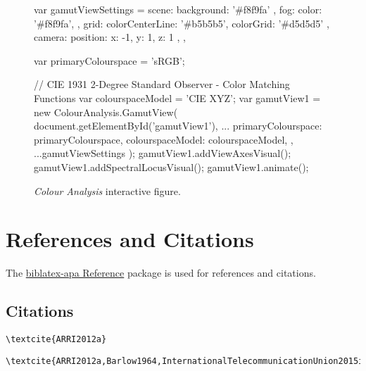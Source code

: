\begin{figure}[H]
    \ifdefined\HCode
        \JavaScript
            var gamutViewSettings = {
                    scene: {
                        background: '#f8f9fa'
                    },
                    fog: {
                        color: '#f8f9fa',
                    },
                    grid: {
                        colorCenterLine: '#b5b5b5',
                        colorGrid: '#d5d5d5'
                    },
                    camera: {
                        position: { x: -1, y: 1, z: 1 },
                    },
            }

            var primaryColourspace = 'sRGB';

            // CIE 1931 2-Degree Standard Observer - Color Matching Functions
            var colourspaceModel = 'CIE XYZ';
            var gamutView1 = new ColourAnalysis.GamutView(
                document.getElementById('gamutView1'),
                {
                    ...{
                        primaryColourspace: primaryColourspace,
                        colourspaceModel: colourspaceModel,
                    },
                    ...gamutViewSettings
                }
            );
            gamutView1.addViewAxesVisual();
            gamutView1.addSpectralLocusVisual();
            gamutView1.animate();
        \EndJavaScript
    \fi
    \caption{\textit{Colour Analysis} interactive figure.}%
    \label{fig:colour-analysis-interactive-figure}
\end{figure}

\section*{References and Citations}%
\label{sec:references-and-citations}

The \href{https://ctan.org/pkg/biblatex-apa}{biblatex-apa Reference} package is used for references and citations.

\subsection*{Citations}%
\label{subsec:citations}

\begin{lstlisting}[caption={Citation for Single Author.}]
\textcite{ARRI2012a}
\end{lstlisting}

\textcite{ARRI2012a}

\begin{lstlisting}[caption={Citation for Multiple Authors.}]
\textcite{ARRI2012a,Barlow1964,InternationalTelecommunicationUnion2015i,Long2014}
\end{lstlisting}

